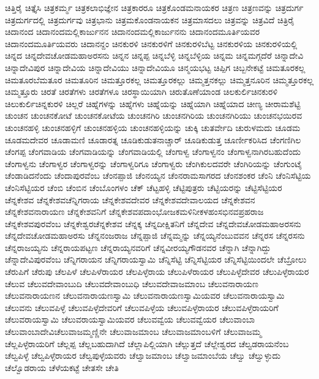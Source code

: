 {ಚಿತ್ತಿರೈ
ಚಿತ್ತೈಸಿ
ಚಿತ್ರಕರ್ಮ್ಮ
ಚಿತ್ರಕಲಾಭಿಜ್ಞೇನ
ಚಿತ್ರಕಾರರೂ
ಚಿತ್ರಕೊಂಡಮನಾಯಕರ
ಚಿತ್ರಣ
ಚಿತ್ರಣವನ್ನು
ಚಿತ್ರದುರ್ಗ
ಚಿತ್ರದುರ್ಗದಲ್ಲಿ
ಚಿತ್ರದುರ್ಗವು
ಚಿತ್ರಭಾನು
ಚಿತ್ರಮಕೊಂಡನಾಯಕನ
ಚಿತ್ರಮಾಸದಲು
ಚಿತ್ರವನ್ನು
ಚಿತ್ರವಿದೆ
ಚಿತ್ರಿರೈ
ಚಿದಾನಂದ
ಚಿದಾನಂದಮಲ್ಲಿಕಾರ್ಜುನನ
ಚಿದಾನಂದಮಲ್ಲಿಕಾರ್ಜುನನು
ಚಿದಾನಂದಮೂರ್ತಿಯವರ
ಚಿದಾನಂದಮೂರ್ತಿಯವರು
ಚಿದಾನನ್ದಂ
ಚಿನಕುರಳಿ
ಚಿನಕುರಳಿಗೆ
ಚಿನಕುರಳಿಬೆಟ್ಟ
ಚಿನಕುರಳಿಯ
ಚಿನಕುರಳಿಯಲ್ಲಿ
ಚಿನ್ನದ
ಚಿನ್ನದೇವಚೋಡಮಹಾಅರಸನು
ಚಿನ್ನನ
ಚಿನ್ನಪ್ಪ
ಚಿನ್ನಬೆಳ್ಳಿ
ಚಿನ್ನಬೆಳ್ಳಿಯ
ಚಿನ್ನಮ
ಚಿನ್ನಮಗ್ಗದೆರೆ
ಚಿನ್ನಾದೇವಿ
ಚಿನ್ನಾದೇವಿಪುರ
ಚಿನ್ನಾದೇವಿಯ
ಚಿನ್ನಾದೇವಿಯು
ಚಿನ್ನಾದೇವಿಯೂ
ಚಿನ್ಮಯಭಟ್ಟ
ಚಿಪ್ಪಿಗ
ಚಿಬ್ಬನೇಕಟ್ಟೆ
ಚಿಮತೂರಕಲ್ಲ
ಚಿಮತೂರಬೆಮತೂರ
ಚಿಮತೂರಿನ
ಚಿಮತ್ತೂರಕಲ್ಲ
ಚಿಮತ್ತೂರಕಲ್ಲು
ಚಿಮ್ಮತ್ತನಕಲ್ಲು
ಚಿಮ್ಮತ್ತನೂರಿನ
ಚಿಮ್ಮತ್ತೂರಕಲ್ಲ
ಚಿಮ್ಮತ್ತೂರು
ಚಿರತೆ
ಚಿರತೆಗಳು
ಚಿರತೆಗಳೂ
ಚಿರಸ್ಥಾಯಿಯಾಗಿ
ಚಿರುತೊಣೆಯಾಂಡ
ಚಿಲಕುರ್ಲಿಚಿನಕುರಳಿ
ಚಿಲುಕುರ್ಲಿಚಿನ್ನಕುರಳಿ
ಚಿಲ್ಲರೆ
ಚಿಹ್ನೆಗಳನ್ನು
ಚಿಹ್ನೆಗಳು
ಚಿಹ್ನೆಯನ್ನು
ಚಿಹ್ನೆಯಾಗಿ
ಚಿಹ್ನೆಯಾದ
ಚೀಣ್ಯ
ಚೀರಾಮಶೆಟ್ಟಿ
ಚುಂಚನ
ಚುಂಚನಕೋಟೆ
ಚುಂಚನಕೋಟೆಯ
ಚುಂಚನಗಿರಿ
ಚುಂಚನಗಿರಿಯ
ಚುಂಚನಗಿರಿಯು
ಚುಂಚನಭಯಿರವ
ಚುಂಚನಹಳ್ಳಿ
ಚುಂಚನಹಳ್ಳಿಗೆ
ಚುಂಚನಹಳ್ಳಿಯ
ಚುಂಚನಹಳ್ಳಿಯನ್ನು
ಚುಕ್ಕಿ
ಚುತರ್ವೇದಿ
ಚುರುಳಮದು
ಚೂಡಮ
ಚೂಡಮದೇವರ
ಚೂಡಾಮಣಿ
ಚೂಡಾರತ್ನ
ಚೂಡಿಕುಡುತನಾಚ್ಚಾರ್
ಚೂಡಿಕುಡುತ್ತ
ಚೂರ್ಣೀಕರಿಸಿದ
ಚೆಂಗಣಿಗಿಲ
ಚೆಂಗಪ್ಪ
ಚೆಂಗವಾಡಿಯ
ಚೆಂಗವಾಡಿಯನ್ನು
ಚೆಂಗವಾಡಿಯಲ್ಲಿ
ಚೆಂಗಾಳ್ವ
ಚೆಂಗಾಳ್ವನಂ
ಚೆಂಗಾಳ್ವನಾಗಿರಬಹುದೆಂದು
ಚೆಂಗಾಳ್ವನು
ಚೆಂಗಾಳ್ವರ
ಚೆಂಗಾಳ್ವರನ್ನು
ಚೆಂಗಾಳ್ವರಿಗೂ
ಚೆಂಗಾಳ್ವರು
ಚೆಂಗಿಕುಲದವರೇ
ಚೆಂಗಿರಿಯನ್ನು
ಚೆಂಗುಂಟೈ
ಚೆಂಡಾಡಿದನೆಂದು
ಚೆಂದಾಪುರವೆಂಬ
ಚೆಂನಪ್ಪಾಜಿ
ಚೆಂನಯ್ಯನ
ಚೆಂನರಾಮಸಾಗರದ
ಚೆಂನಶಂಕರ
ಚೆಂನಿ
ಚೆಂನಿಸೆಟ್ಟಿಯ
ಚೆಂನಿಸೆಟ್ಟಿಯರ
ಚೆಂಬಿ
ಚೆಂಬಿನ
ಚೆಂಬೊಂಗಳಂ
ಚೆಕ್
ಚೆಟ್ಟಹಳ್ಳಿ
ಚೆಟ್ಟಿಪುತ್ರರು
ಚೆಟ್ಟಿಯರನ್ನು
ಚೆಟ್ಟಿಸೆಟ್ಟಿಯರ
ಚೆನ್ನಕೇಶವ
ಚೆನ್ನಕೇಶವಚೆನ್ನಿಗರಾಯ
ಚೆನ್ನಕೇಶವದೇವರ
ಚೆನ್ನಕೇಶವದೇವಾಲಯದ
ಚೆನ್ನಕೇಶವನ
ಚೆನ್ನಕೇಶವನಾರಾಯಣ
ಚೆನ್ನಕೇಶವನಿಗೆ
ಚೆನ್ನಕೇಶವಪದಾಂಭೋಜಕಮಳಿನೀಕಳಹಂಸಭಿನವಪ್ರಹರಾಜ
ಚೆನ್ನಕೇಶವಪುರವೆಂಬ
ಚೆನ್ನಕೇಶ್ವರಚೆನ್ನಕೇಶವ
ಚೆನ್ನಕ್ಕ
ಚೆನ್ನದೀಕ್ಷಿತನಿಗೆ
ಚೆನ್ನದೇವ
ಚೆನ್ನದೇವಚೋಡಮಹಾಅರಸನು
ಚೆನ್ನದೇವಚೋಡಮಹಾಅರಸು
ಚೆನ್ನನಂಜರಾಜ
ಚೆನ್ನಪ್ಪಾಜಿ
ಚೆನ್ನಮ್ಮನ್ನು
ಚೆನ್ನಯ್ಯನೆಂಬುವವನ
ಚೆನ್ನರಸ
ಚೆನ್ನರಸನು
ಚೆನ್ನರಾಜಯ್ಯನು
ಚೆನ್ನರಾಯಪಟ್ಟಣ
ಚೆನ್ನರಾಯ್ಯನವರಿಗೆ
ಚೆನ್ನವೀರಯ್ಯಗೌಡನವರ
ಚೆನ್ನಾಗಿ
ಚೆನ್ನಾಗಿದ್ದು
ಚೆನ್ನಾದೇವಿಪುರವೆಂಬ
ಚೆನ್ನಿಗರಾಯನ
ಚೆನ್ನಿಗರಾಯಸ್ವಾಮಿ
ಚೆನ್ನಿಸೆಟ್ಟಿ
ಚೆನ್ನಿಸೆಟ್ಟಿಯರ
ಚೆನ್ನಿಸೆಟ್ಟಿಯಿಂದಲೇ
ಚೆಬ್ರೋಲು
ಚೆರುಪಿಗೆ
ಚೆರುಪು
ಚೆಲಪಿಳೆ
ಚೆಲಪಿಳೆರಾಯರ
ಚೆಲಪಿಳ್ಳೆರಾಯ
ಚೆಲುಪಿಳೆರಾಯರ
ಚೆಲುಪಿಳ್ಳೆದೇವರ
ಚೆಲುಪಿಳ್ಳೆರಾಯರ
ಚೆಲುವ
ಚೆಲುವದೇವಾಂಬುದಿ
ಚೆಲುವದೇವಾಂಬುಧಿ
ಚೆಲುವದೇವಾಜಮಾಂಬ
ಚೆಲುವನಾರಾಯಣ
ಚೆಲುವನಾರಾಯಣನ
ಚೆಲುವನಾರಾಯಣಸ್ವಾಮಿ
ಚೆಲುವನಾರಾಯಣಸ್ವಾಮಿಯವರ
ಚೆಲುವನಾರಾಯಸ್ವಾಮಿ
ಚೆಲುವನು
ಚೆಲುವಪಿಳ್ಳೆ
ಚೆಲುವಪಿಳ್ಳೆದೇವರಿಗೆ
ಚೆಲುವಪಿಳ್ಳೆಯ
ಚೆಲುವಪಿಳ್ಳೆರಾಯರ
ಚೆಲುವಪಿಳ್ಳೆರಾಯರಿಗೆ
ಚೆಲುವರಾಯಸ್ವಾಮಿ
ಚೆಲುವರಾಯಸ್ವಾಮಿಯವರ
ಚೆಲುವವ್ವೆಯ
ಚೆಲುವವ್ವೆಯರ
ಚೆಲುವಾಂಬಾ
ಚೆಲುವಾಂಬಾದೇವಿಚೆಲುವಾಜಮ್ಮಣ್ಣಿನೇ
ಚೆಲುವಾಜಮಾಂಬ
ಚೆಲುವಾಜಮಾಂಬಳಿಗೆ
ಚೆಲುವಾಜಮ್ಮ
ಚೆಲ್ಲಪಿಳ್ಳೆರಾಯರಿಗೆ
ಚೆಲ್ಲಪ್ಪ
ಚೆಲ್ಲಬಹುದಾಗಿದೆ
ಚೆಲ್ಲಾಪಿಲ್ಲಿಯಾಗಿ
ಚೆಲ್ಲುತ್ತದೆ
ಚೆಲ್ಲೇಶ್ವರದ
ಚೆಲ್ವಡರಾಯನೆಂಬ
ಚೆಲ್ವಪಿಳ್ಳೆ
ಚೆಲ್ವಪಿಳ್ಳೆರಾಯರ
ಚೆಲ್ವಪುಳ್ಳೆಯವರು
ಚೆಲ್ವಾಜಮಾಂಬ
ಚೆಲ್ವಾಜಮಾಂಬೆಯ
ಚೆಲ್ವು
ಚೆಲ್ವುಳ್ಳುದು
ಚೆಲ್ವೊಡರಾಯ
ಚೆಳೆಯಕಟ್ಟೆ
ಚೇತಸೇ
ಚೇತಿ
}
